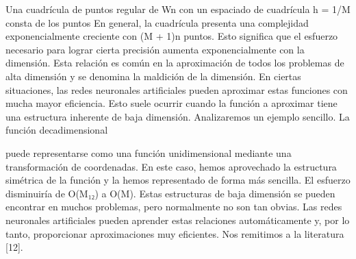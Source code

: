 \begin{frame}
  Una cuadrícula de puntos regular de Wn con un espaciado de cuadrícula h = 1/M consta de los puntos
  En general, la cuadrícula presenta una complejidad exponencialmente creciente con (M + 1)n puntos. Esto significa que el esfuerzo necesario para lograr cierta precisión aumenta exponencialmente con la dimensión. Esta relación es común en la aproximación de todos los problemas de alta dimensión y se denomina la maldición de la dimensión.
  En ciertas situaciones, las redes neuronales artificiales pueden aproximar estas funciones con mucha mayor eficiencia. Esto suele ocurrir cuando la función a aproximar tiene una estructura inherente de baja dimensión. Analizaremos un ejemplo sencillo. La función decadimensional

  puede representarse como una función unidimensional mediante una transformación de coordenadas. En este caso, hemos aprovechado la estructura simétrica de la función y la hemos representado de forma más sencilla. El esfuerzo disminuiría de O(M₁₂) a O(M). Estas estructuras de baja dimensión se pueden encontrar en muchos problemas, pero normalmente no son tan obvias.
  Las redes neuronales artificiales pueden aprender estas relaciones
  automáticamente y, por lo tanto, proporcionar aproximaciones muy eficientes. Nos remitimos a la literatura [12].
\end{frame}

